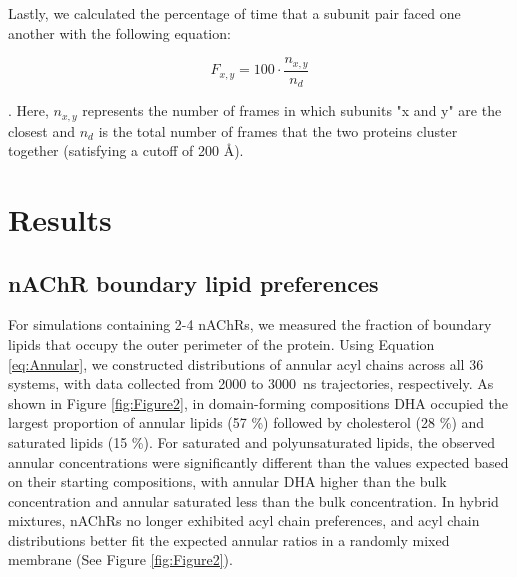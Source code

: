 \documentclass[final,3p,times,twocolumn]{elsarticle}
\begin{document}
Lastly, we calculated the percentage of time that a subunit pair faced one another with the following equation: 

\begin{equation}\label{eq:subunit}
F_{x,y} = 100\cdot \frac{n_{x,y}}{n_d}
\end{equation}

. Here, $n_{x,y}$ represents the number of frames in which subunits "x and y" are the closest and $n_d$ is the total number of frames that the two proteins cluster together (satisfying a cutoff of 200 {\AA}).

\section{Results}

\subsection{nAChR boundary lipid preferences}\label{sec:lipids}

For simulations containing 2-4 nAChRs, we measured the fraction of boundary lipids that occupy the outer perimeter of the protein. Using Equation \ref{eq:Annular}, we constructed distributions of annular acyl chains across all 36 systems, with data collected from 2000 to 3000~ns trajectories, respectively. As shown in Figure \ref{fig:Figure2}, in domain-forming compositions DHA occupied the largest proportion of annular lipids (57 \%) followed by cholesterol (28 \%) and saturated lipids (15 \%). For saturated and polyunsaturated lipids, the observed annular concentrations were significantly different than the values expected based on their starting compositions, with annular DHA higher than the bulk concentration and annular saturated less than the bulk concentration.  In hybrid mixtures, nAChRs no longer exhibited acyl chain preferences, and acyl chain distributions better fit the expected annular ratios in a randomly mixed membrane (See Figure \ref{fig:Figure2}).
\end{document}
